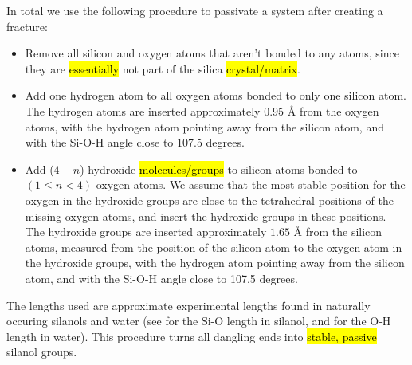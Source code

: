 In total we use the following procedure to passivate a system after creating a fracture:
\begin{itemize}
    \item Remove all silicon and oxygen atoms that aren't bonded to any atoms, since they are \hl{essentially} not part of the silica \hl{crystal/matrix}.
    \item Add one hydrogen atom to all oxygen atoms bonded to only one silicon atom. The hydrogen atoms are inserted approximately $0.95\text{ \AA}$ from the oxygen atoms, with the hydrogen atom pointing away from the silicon atom, and with the Si-O-H angle close to 107.5 degrees.
    \item Add ($4-n$) hydroxide \hl{molecules/groups} to silicon atoms bonded to $(1\leq n<4)$ oxygen atoms. We assume that the most stable position for the oxygen in the hydroxide groups are close to the tetrahedral positions of the missing oxygen atoms, and insert the hydroxide groups in these positions. %
    The hydroxide groups are inserted approximately $1.65\text{ \AA}$ from the silicon atoms, measured from the position of the silicon atom to the oxygen atom in the hydroxide groups, with the hydrogen atom pointing away from the silicon atom, and with the Si-O-H angle close to 107.5 degrees.
\end{itemize}
The lengths used are approximate experimental lengths found in naturally occuring silanols and water (see \cite{lickiss1995synthesis} for the Si-O length in silanol, and \cite{csaszar2005equilibrium} for the O-H length in water). This procedure turns all dangling ends into \hl{stable, passive} silanol groups.
%
